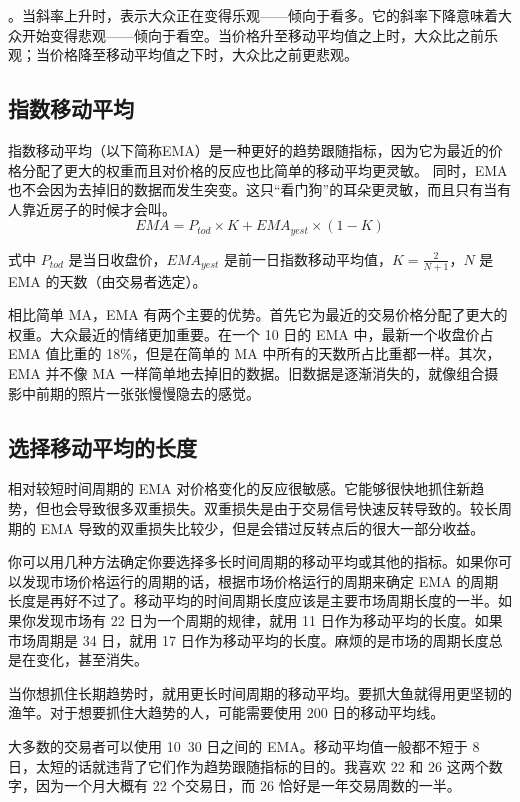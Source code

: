 。当斜率上升时，表示大众正在变得乐观——倾向于看多。它的斜率下降意味着大众开始变得悲观——倾向于看空。当价格升至移动平均值之上时，大众比之前乐观；当价格降至移动平均值之下时，大众比之前更悲观。
\subsection*{指数移动平均}
指数移动平均（以下简称EMA）是一种更好的趋势跟随指标，因为它为最近的价格分配了更大的权重而且对价格的反应也比简单的移动平均更灵敏。
同时，EMA也不会因为去掉旧的数据而发生突变。这只“看门狗”的耳朵更灵敏，而且只有当有人靠近房子的时候才会叫。
\begin{equation}
    EMA=P_{tod}\times K+EMA_{yest}\times (1-K)
\end{equation}

式中 $P_{tod}$ 是当日收盘价，$EMA_{yest}$ 是前一日指数移动平均值，$K=\frac{2}{N+1}$，$N$ 是 EMA 的天数（由交易者选定）。

相比简单 MA，EMA 有两个主要的优势。首先它为最近的交易价格分配了更大的权重。大众最近的情绪更加重要。在一个 10 日的 EMA 中，最新一个收盘价占 EMA 值比重的 18\%，但是在简单的 MA 中所有的天数所占比重都一样。其次，EMA 并不像 MA 一样简单地去掉旧的数据。旧数据是逐渐消失的，就像组合摄影中前期的照片一张张慢慢隐去的感觉。
\subsection*{选择移动平均的长度}
相对较短时间周期的 EMA 对价格变化的反应很敏感。它能够很快地抓住新趋势，但也会导致很多双重损失。双重损失是由于交易信号快速反转导致的。较长周期的 EMA 导致的双重损失比较少，但是会错过反转点后的很大一部分收益。

你可以用几种方法确定你要选择多长时间周期的移动平均或其他的指标。如果你可以发现市场价格运行的周期的话，根据市场价格运行的周期来确定 EMA 的周期长度是再好不过了。移动平均的时间周期长度应该是主要市场周期长度的一半。如果你发现市场有 22 日为一个周期的规律，就用 11 日作为移动平均的长度。如果市场周期是 34 日，就用 17 日作为移动平均的长度。麻烦的是市场的周期长度总是在变化，甚至消失。

当你想抓住长期趋势时，就用更长时间周期的移动平均。要抓大鱼就得用更坚韧的渔竿。对于想要抓住大趋势的人，可能需要使用 200 日的移动平均线。

大多数的交易者可以使用 10~30 日之间的 EMA。移动平均值一般都不短于 8 日，太短的话就违背了它们作为趋势跟随指标的目的。我喜欢 22 和 26 这两个数字，因为一个月大概有 22 个交易日，而 26 恰好是一年交易周数的一半。

